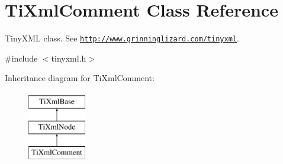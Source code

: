 \hypertarget{class_ti_xml_comment}{}\section{Ti\+Xml\+Comment Class Reference}
\label{class_ti_xml_comment}


Tiny\+X\+ML class. See \href{http://www.grinninglizard.com/tinyxml}{\tt http\+://www.\+grinninglizard.\+com/tinyxml}.  




{\ttfamily \#include $<$tinyxml.\+h$>$}

Inheritance diagram for Ti\+Xml\+Comment\+:\begin{figure}[H]
\begin{center}
\leavevmode
\includegraphics[height=3.000000cm]{class_ti_xml_comment}
\end{center}
\end{figure}
